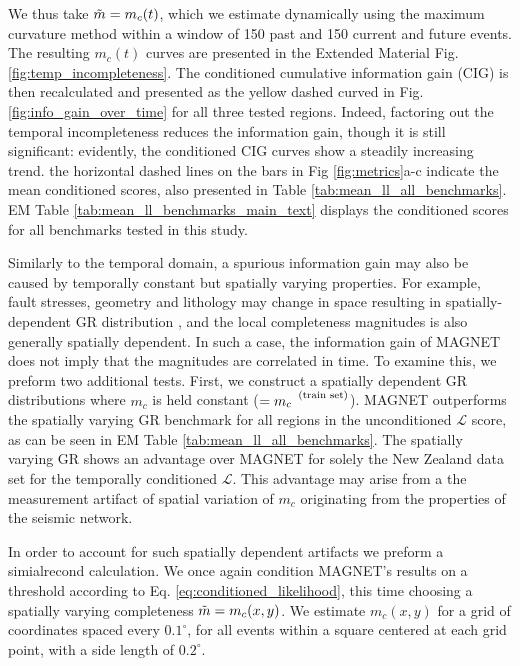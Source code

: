 \documentclass[pdflatex]{sn-jnl}
\begin{document}
We thus take $\Tilde{m}=m_c(t)$, which we estimate dynamically using the maximum curvature method \cite{wiemer_minimum_2000} within a window of 150 past and 150 current and future events. The resulting $m_c(t)$ curves are presented in the Extended Material Fig. \ref{fig:temp_incompleteness}. The conditioned cumulative information gain (CIG) is then recalculated and presented as the yellow dashed curved in Fig.  \ref{fig:info_gain_over_time} for all three tested regions. 
Indeed, factoring out the temporal incompleteness reduces the information gain, though it is still significant: evidently, the conditioned CIG curves show a steadily increasing trend. the horizontal dashed lines on the bars in Fig \ref{fig:metrics}a-c indicate the mean conditioned scores, also presented in Table \ref{tab:mean_ll_all_benchmarks}. EM Table \ref{tab:mean_ll_benchmarks_main_text} displays the conditioned scores for all benchmarks tested in this study.

Similarly to the temporal domain, a spurious information gain may also be caused by temporally constant but spatially varying properties. For example, fault stresses, geometry and lithology may change in space resulting in spatially-dependent GR distribution \cite{amitrano_brittle-ductile_2003, scholz_stress_2015, herrmann_revealing_2022, taroni_earthquake_2023}, and the local completeness magnitudes is also generally spatially dependent. In such a case, the information gain of MAGNET does not imply that the magnitudes are correlated in time. 
To examine this, we preform two additional tests. First, we construct a spatially dependent GR distributions where $m_c$ is held constant ($=m_c^{\mbox{\footnotesize (train set)}}$). MAGNET outperforms the spatially varying GR benchmark for all regions in the unconditioned $\mathcal{L}$ score, as can be seen in EM Table \ref{tab:mean_ll_all_benchmarks}. The spatially varying GR shows an advantage over MAGNET for solely the New Zealand data set for the temporally conditioned $\mathcal{L}$. This advantage may arise from a the measurement artifact of spatial variation of $m_c$ originating from the properties of the seismic network.

In order to account for such spatially dependent artifacts we preform a simialrecond calculation. We once again condition MAGNET's results on a threshold according to Eq. \ref{eq:conditioned_likelihood}, this time choosing a spatially varying completeness $\Tilde{m}=m_c(x,y)$. We estimate $m_c(x,y)$ for a grid of coordinates spaced every $0.1^\circ$, for all events within a square centered at each grid point, with a side length of $0.2^\circ$. 
\end{document}
